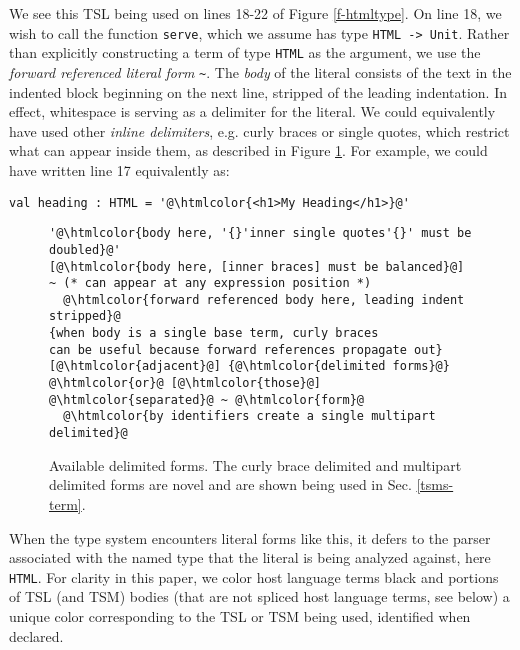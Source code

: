 \documentclass{sig-alternate}
\newcommand{\htmlcolor}[1]{\textcolor[HTML]{339933}{#1}}
\newcommand{\mycaption}[1]{\vspace{-4px}\caption{#1}\vspace{-2px}}
\begin{document}
We see this TSL being used on lines 18-22 of Figure \ref{f-htmltype}. On line 18, we wish to call the function \verb|serve|, which we assume has type \verb|HTML -> Unit|. Rather than explicitly constructing a term of type \verb|HTML| as the argument, we use the \emph{forward referenced literal form} \lstinline[style=wyvern]{~}. The \emph{body} of the literal consists of the text in the indented block beginning on the next line, stripped of the leading indentation. In effect, whitespace is serving as a delimiter for the literal. We could equivalently have used other \emph{inline delimiters}, e.g. curly braces or single quotes, which restrict what can appear inside them, as described in Figure \ref{f-delimited}. For example, we could have written line 17 equivalently as:
\vspace{-3px}\begin{lstlisting}[style=wyvern, numbers=none, frame=none]
  val heading : HTML = '@\htmlcolor{<h1>My Heading</h1>}@'
\end{lstlisting}\vspace{-4px}

\begin{figure}[t]
\begin{lstlisting}[style=tempwyvern]
'@\htmlcolor{body here, '{}'inner single quotes'{}' must be doubled}@'
[@\htmlcolor{body here, [inner braces] must be balanced}@]
~ (* can appear at any expression position *)
  @\htmlcolor{forward referenced body here, leading indent stripped}@
{when body is a single base term, curly braces
can be useful because forward references propagate out}
[@\htmlcolor{adjacent}@] {@\htmlcolor{delimited forms}@} @\htmlcolor{or}@ [@\htmlcolor{those}@] @\htmlcolor{separated}@ ~ @\htmlcolor{form}@
  @\htmlcolor{by identifiers create a single multipart delimited}@
\end{lstlisting}
\mycaption{Available delimited forms. The curly brace delimited and multipart delimited forms are novel and are shown being used in Sec. \ref{tsms-term}. }
\label{f-delimited}
\end{figure}


When the type system encounters literal forms like this, it defers to the parser associated with the named type that the literal is being analyzed against, here \verb|HTML|. For clarity in this paper, we color host language terms black and portions of TSL (and TSM) bodies (that are not spliced host language terms, see below)  a unique color corresponding to the TSL or TSM being used, identified when declared. 
\end{document}
